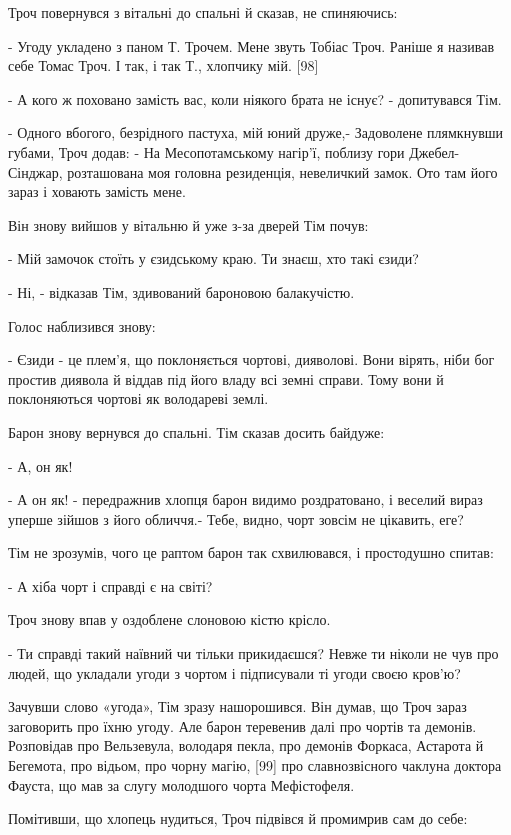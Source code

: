 Троч повернувся з вітальні до спальні й сказав, не спиняючись:

- Угоду укладено з паном Т. Трочем. Мене звуть Тобіас Троч. Раніше я називав себе Томас Троч. І так, і так Т., хлопчику мій. [98]

- А кого ж поховано замість вас, коли ніякого брата не існує? - допитувався Тім.

- Одного вбогого, безрідного пастуха, мій юний друже,- Задоволене плямкнувши губами, Троч додав: - На Месопотамському нагір'ї, поблизу гори Джебел-Сінджар, розташована моя головна резиденція, невеличкий замок. Ото там його зараз і ховають замість мене.

Він знову вийшов у вітальню й уже з-за дверей Тім почув:

- Мій замочок стоїть у єзидському краю. Ти знаєш, хто такі єзиди?

- Ні, - відказав Тім, здивований бароновою балакучістю.

Голос наблизився знову:

- Єзиди - це плем'я, що поклоняється чортові, дияволові. Вони вірять, ніби бог простив диявола й віддав під його владу всі земні справи. Тому вони й поклоняються чортові як володареві землі.

Барон знову вернувся до спальні. Тім сказав досить байдуже:

- А, он як!

- А он як! - передражнив хлопця барон видимо роздратовано, і веселий вираз уперше зійшов з його обличчя.- Тебе, видно, чорт зовсім не цікавить, еге?

Тім не зрозумів, чого це раптом барон так схвилювався, і простодушно спитав:

- А хіба чорт і справді є на світі?

Троч знову впав у оздоблене слоновою кістю крісло.

- Ти справді такий наївний чи тільки прикидаєшся? Невже ти ніколи не чув про людей, що укладали угоди з чортом і підписували ті угоди своєю кров'ю?

Зачувши слово «угода», Тім зразу нашорошився. Він думав, що Троч зараз заговорить про їхню угоду. Але барон теревенив далі про чортів та демонів. Розповідав про Вельзевула, володаря пекла, про демонів Форкаса, Астарота й Бегемота, про відьом, про чорну магію, [99] про славнозвісного чаклуна доктора Фауста, що мав за слугу молодшого чорта Мефістофеля.

Помітивши, що хлопець нудиться, Троч підвівся й промимрив сам до себе:

